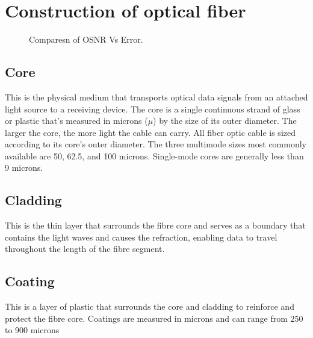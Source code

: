 \documentclass[12pt]{report}
\begin{document}
	\section{Construction of optical fiber}
	\begin{figure}[htbp]
		\caption{Comparesn of OSNR Vs Error.}
		\label{fig1}
	\end{figure}
	\subsection*{Core}
	This is the physical medium that transports optical data signals from an attached light source to a receiving device. The core is a single continuous strand of glass or plastic that’s measured in microns ($\mu$) by the size of its outer diameter. The larger the core, the more light the cable can carry. All fiber optic cable is sized according to its core’s outer diameter. The three multimode sizes most commonly available are 50, 62.5, and 100 microns. Single-mode cores are generally less than 9 microns.
	\subsection*{Cladding}
	This is the thin layer that surrounds the fibre core and serves as a boundary that contains the light waves and causes the refraction, enabling data to travel throughout the length of the fibre segment. 
	\subsection*{Coating}
	This is a layer of plastic that surrounds the core and cladding to reinforce and protect the fibre core. Coatings are measured in microns and can range from 250 to 900 microns
\end{document}
